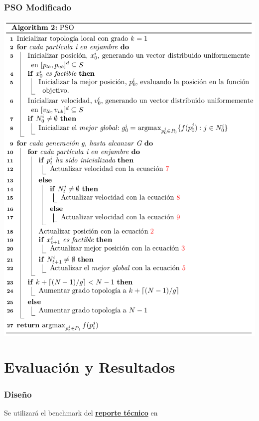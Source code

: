 \documentclass[10pt, compress]{beamer}
\begin{document}
\begin{frame}[fragile]
  \frametitle{PSO Modificado}
    \begin{center}
    \includegraphics[scale=0.25]{mpso.png}
    \end{center}
\end{frame}

\section{Evaluación y Resultados}

\begin{frame}[fragile]
  \frametitle{Diseño}
    \begin{center}
         Se utilizará el benchmark del \href{http://web.mysites.ntu.edu.sg/epnsugan/PublicSite/Shared%20Documents/CEC-2017/Constrained/Technical%20Report%20-%20CEC2017-%20Final.pdf}{\textbf{reporte técnico}} en \cite{suganthan16}
    \end{center}{}
\end{frame}
\end{document}
